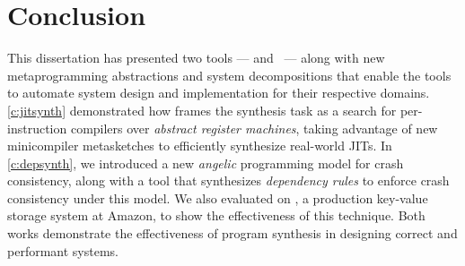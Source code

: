 \chapter{Conclusion}
This dissertation has presented two tools --- \jitsynth and \depsynth\ ---
along with new metaprogramming abstractions and system decompositions
that enable the tools to automate system design and implementation for their
respective domains.
\cref{c:jitsynth} demonstrated how \jitsynth frames the synthesis task
as a search for per-instruction compilers over \textit{abstract register machines},
taking advantage of new minicompiler metasketches to efficiently synthesize
real-world JITs.
In \cref{c:depsynth}, we introduced a new \textit{angelic} programming model for
crash consistency, along with a tool \depsynth that synthesizes
\textit{dependency rules} to enforce crash consistency under this model.
We also evaluated \depsynth on \shardstore, a production key-value storage system
at Amazon, to show the effectiveness of this technique.
Both works demonstrate the effectiveness of program synthesis in
designing correct and performant systems.

